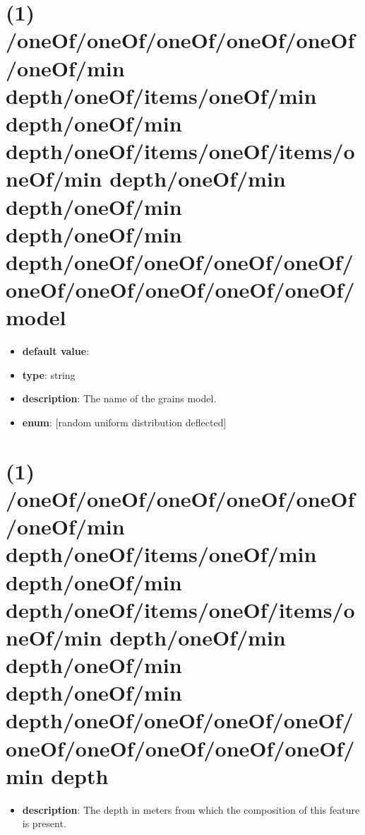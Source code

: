 \section{(1) /oneOf/oneOf/oneOf/oneOf/oneOf/oneOf/min depth/oneOf/items/oneOf/min depth/oneOf/min depth/oneOf/items/oneOf/items/oneOf/min depth/oneOf/min depth/oneOf/min depth/oneOf/min depth/oneOf/oneOf/oneOf/oneOf/oneOf/oneOf/oneOf/oneOf/oneOf/model}
\begin{itemize}[leftmargin=1em]\item {\bf default value}: 
\item {\bf type}: string
\item {\bf description}: The name of the grains model.
\item {\bf enum}: [random uniform distribution deflected]\end{itemize}\section{(1) /oneOf/oneOf/oneOf/oneOf/oneOf/oneOf/min depth/oneOf/items/oneOf/min depth/oneOf/min depth/oneOf/items/oneOf/items/oneOf/min depth/oneOf/min depth/oneOf/min depth/oneOf/min depth/oneOf/oneOf/oneOf/oneOf/oneOf/oneOf/oneOf/oneOf/oneOf/min depth}
\begin{itemize}[leftmargin=1em]\item {\bf description}: The depth in meters from which the composition of this feature is present.
\end{itemize}
